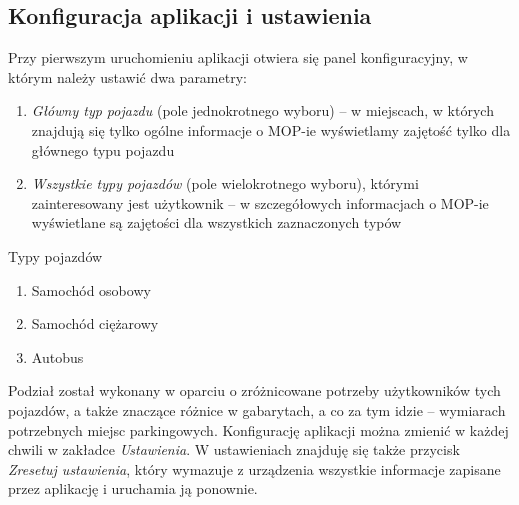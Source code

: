 \subsection{Konfiguracja aplikacji i ustawienia}
Przy pierwszym uruchomieniu aplikacji otwiera się panel konfiguracyjny, w którym należy ustawić dwa parametry:
\begin{enumerate}
\item \textit{Główny typ pojazdu} (pole jednokrotnego wyboru) -- w miejscach, w których znajdują się tylko ogólne informacje o MOP-ie wyświetlamy zajętość tylko dla głównego typu pojazdu
\item \textit{Wszystkie typy pojazdów} (pole wielokrotnego wyboru), którymi zainteresowany jest użytkownik -- w szczegółowych informacjach o MOP-ie wyświetlane są zajętości dla wszystkich zaznaczonych typów
\end{enumerate}
Typy pojazdów
\begin{enumerate}
\item Samochód osobowy
\item Samochód ciężarowy
\item Autobus
\end{enumerate}
Podział został wykonany w oparciu o zróżnicowane potrzeby użytkowników tych pojazdów, a także znaczące różnice w gabarytach, a co za tym idzie -- wymiarach potrzebnych miejsc parkingowych.
Konfigurację aplikacji można zmienić w każdej chwili w zakładce \emph{Ustawienia}.
W ustawieniach znajduję się także przycisk \textit{Zresetuj ustawienia}, który wymazuje z urządzenia wszystkie informacje zapisane przez aplikację i uruchamia ją ponownie. 

